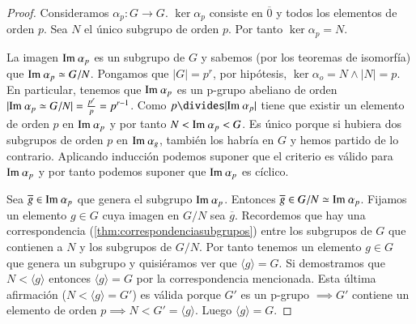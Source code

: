 \begin{proof}
	Consideramos $\alpha_p : G \to G$. $\ker \alpha_p$ consiste en $\overline{0}$ y todos los elementos de orden $p$. Sea $N$ el único subgrupo de orden $p$. Por tanto $\ker \alpha_p = N$.
	
	La imagen $\text{Im } \alpha_p$ es un subgrupo de $G$ y sabemos (por los teoremas de isomorfía) que $\text{Im } \alpha_p \simeq G / N$. Pongamos que $|G| = p^r$, por hipótesis, $\ker \alpha_o = N \land |N| = p$. En particular, tenemos que $\text{Im } \alpha_p$ es un p-grupo abeliano de orden $|\text{Im } \alpha_p \simeq G/N| = \frac{p^r}{p} = p^{r-1}$.  Como $p \divides |\ima \alpha_p|$ tiene que existir un elemento de orden $p$ en $\text{Im } \alpha_p$ y por tanto $N < \text{Im } \alpha_p < G$. Es único porque si hubiera dos subgrupos de orden $p$ en $\text{Im } \alpha_g$, también los habría en $G$ y hemos partido de lo contrario. Aplicando inducción podemos suponer que el criterio es válido para $\text{Im } \alpha_p$ y por tanto podemos suponer que $\text{Im } \alpha_p$ es cíclico.
	
	Sea $\overline{g} \in \text{Im } \alpha_p$ que genera el subgrupo $\text{Im } \alpha_p$. Entonces $\overline{g} \in G/N \simeq \text{Im } \alpha_p$. Fijamos un elemento $g \in G$ cuya imagen en $G / N$ sea $\overline{g}$. Recordemos que hay una correspondencia (\ref{thm:correspondenciasubgrupos}) entre los subgrupos de $G$ que contienen a $N$ y los subgrupos de $G/N$. Por tanto tenemos un elemento $g \in G$ que genera un subgrupo y quisiéramos ver que $\langle g \rangle = G$. Si demostramos que $N < \langle g \rangle$ entonces $\langle g \rangle = G$ por la correspondencia mencionada. Esta última afirmación ($N < \langle g \rangle = G'$) es válida porque $G'$ es un p-grupo $\implies G'$ contiene un elemento de orden $p \implies N < G' = \langle g \rangle$. Luego $\langle g \rangle = G$.
\end{proof}